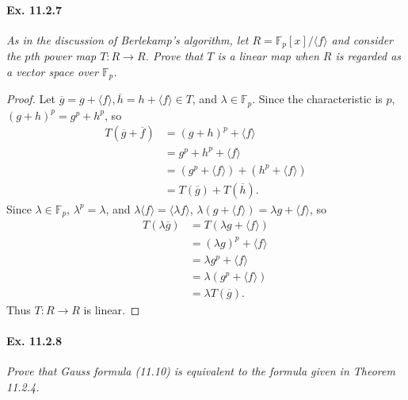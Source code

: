 \documentclass[11pt,a4paper]{article}
\newcommand{\F}{\mathbb{F}}
\begin{document}
\paragraph{Ex. 11.2.7}

{\it As in the discussion of Berlekamp's algorithm, let $R = \F_p[x]/\langle f \rangle$ and consider the $p$th power map $T : R \to R$. Prove that $T$ is a linear map when $R$ is regarded as a vector space over $\F_p$.
}

\begin{proof}
Let $\overline{g} = g+\langle f \rangle, \overline{h} = h+\langle f \rangle \in T$, and $\lambda \in \F_p$. Since the characteristic is $p$, $(g+h)^p = g^p+h^p$, so
\begin{align*}
T(\overline{g} + \overline{f}) 
&=(g+h)^p + \langle f \rangle\\
&=g^p+h^p+\langle f \rangle\\
&= (g^p+\langle f \rangle)+ (h^p+\langle f \rangle)\\
&= T(\overline{g}) + T(\overline{h}).
\end{align*}
Since $\lambda \in \F_p$, $\lambda^p=\lambda$, and $\lambda \langle f \rangle = \langle \lambda f \rangle$, $\lambda(g +\langle f \rangle) = \lambda g + \langle f \rangle$, so
\begin{align*}
T(\lambda \overline{g}) &= T(\lambda g + \langle f \rangle)\\
&=(\lambda g)^p + \langle f \rangle\\
&=\lambda g^p +\langle f \rangle\\
&=\lambda(g^p + \langle f \rangle)\\
&=\lambda T(\overline{g}).
\end{align*}
Thus $T:R\to R$ is linear.
\end{proof}

\paragraph{Ex. 11.2.8}

{\it Prove that Gauss formula (11.10) is equivalent to the formula given in Theorem 11.2.4.
}
\end{document}
